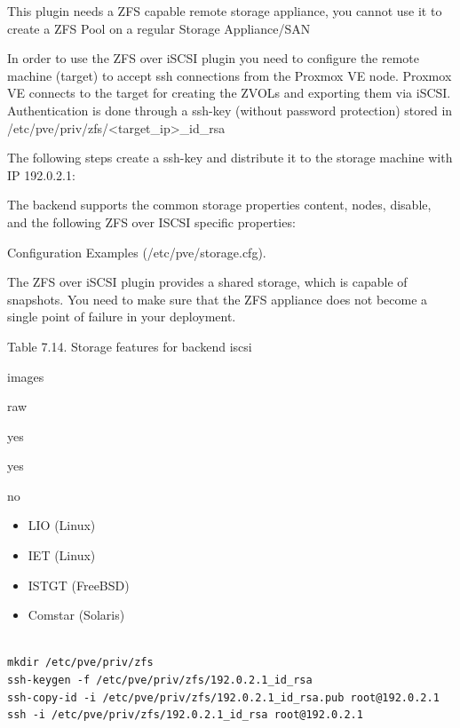 This plugin needs a ZFS capable remote storage appliance, you cannot use it to create a ZFS Pool on a regular Storage Appliance/SAN

In order to use the ZFS over iSCSI plugin you need to configure the remote machine (target) to accept ssh connections from the Proxmox VE node. Proxmox VE connects to the target for creating the ZVOLs and exporting them via iSCSI. Authentication is done through a ssh-key (without password protection) stored in /etc/pve/priv/zfs/<target_ip>_id_rsa

The following steps create a ssh-key and distribute it to the storage machine with IP 192.0.2.1:

The backend supports the common storage properties content, nodes, disable, and the following ZFS over ISCSI specific properties:

Configuration Examples (/etc/pve/storage.cfg).

The ZFS over iSCSI plugin provides a shared storage, which is capable of snapshots. You need to make sure that the ZFS appliance does not become a single point of failure in your deployment.

Table 7.14. Storage features for backend iscsi

images

raw

yes

yes

no

\begin{itemize}[leftmargin=2cm]

	\item LIO (Linux)

	\item IET (Linux)

	\item ISTGT (FreeBSD)

	\item Comstar (Solaris)

\end{itemize}

\begin{lstlisting}

mkdir /etc/pve/priv/zfs
ssh-keygen -f /etc/pve/priv/zfs/192.0.2.1_id_rsa
ssh-copy-id -i /etc/pve/priv/zfs/192.0.2.1_id_rsa.pub root@192.0.2.1
ssh -i /etc/pve/priv/zfs/192.0.2.1_id_rsa root@192.0.2.1

\end{lstlisting}

